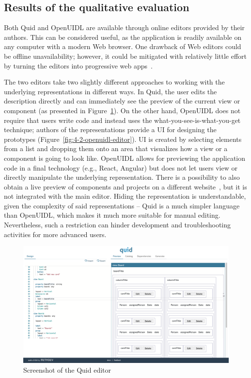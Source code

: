 \subsection{Results of the qualitative evaluation}\label{subsec:results-of-the-qualitative-evaluation}
Both Quid and OpenUIDL are available through online editors provided by their authors.
This can be considered useful, as the application is readily available on any computer with a modern Web browser.
One drawback of Web editors could be offline unavailability;
however, it could be mitigated with relatively little effort by turning the editors into progressive web apps~.

The two editors take two slightly different approaches to working with the underlying representations in different ways.
In Quid, the user edits the description directly and can immediately see the preview of the current view or component (as presented in Figure~\ref{fig:4-2-quid-editor}).
On the other hand, OpenUIDL does not require that users write code and instead uses the what-you-see-is-what-you-get technique; authors of the representations provide a UI for designing the prototypes (Figure~\ref{fig:4-2-openuidl-editor}).
UI is created by selecting elements from a list and dropping them onto an area that visualizes how a view or a component is going to look like.
OpenUIDL allows for previewing the application code in a final technology (e.g., React, Angular) but does not let users view or directly manipulate the underlying representation.
There is a possibility to also obtain a live preview of components and projects on a different website~, but it is not integrated with the main editor.
Hiding the representation is understandable, given the complexity of said representations -- Quid is a much simpler language than OpenUIDL, which makes it much more suitable for manual editing.
Nevertheless, such a restriction can hinder development and troubleshooting activities for more advanced users.

\begin{figure}[tbh]
    \centering
    \includegraphics[width=\textwidth]{4-results-and-discussion/quid-editor}
    \caption{Screenshot of the Quid editor}
    \label{fig:4-2-quid-editor}
\end{figure}

